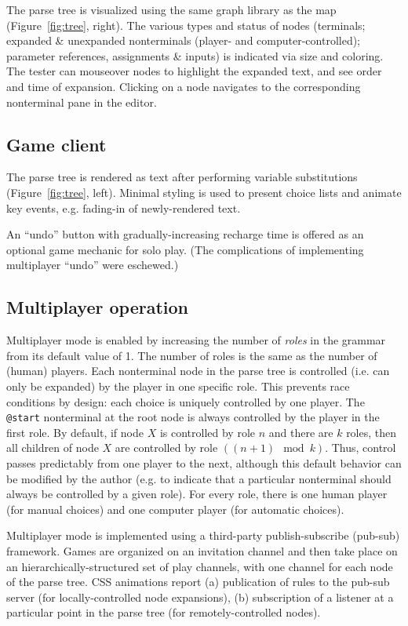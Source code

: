 \documentclass{acm_proc_article-sp}
\begin{document}
The parse tree is visualized using the same graph library as the map (Figure~\ref{fig:tree}, right).
The various types and status of nodes (terminals; expanded \& unexpanded nonterminals (player- and computer-controlled); parameter references, assignments \& inputs) is indicated via size and coloring.
The tester can mouseover nodes to highlight the expanded text, and see order and time of expansion.
Clicking on a node navigates to the corresponding nonterminal pane in the editor.

\subsection{Game client}

The parse tree is rendered as text after performing variable substitutions (Figure~\ref{fig:tree}, left).
Minimal styling is used to present choice lists and animate key events,
e.g. fading-in of newly-rendered text.

An ``undo'' button with gradually-increasing recharge time is offered as an optional game mechanic for solo play.
(The complications of implementing multiplayer ``undo'' were eschewed.)

\subsection{Multiplayer operation}

Multiplayer mode is enabled by increasing the number of {\em roles} in the grammar from its default value of 1.
The number of roles is the same as the number of (human) players.
Each nonterminal node in the parse tree is controlled (i.e. can only be expanded) by the player in one specific role.
This prevents race conditions by design: each choice is uniquely controlled by one player.
The {\tt @start} nonterminal at the root node is always controlled by the player in the first role.
By default, if node $X$ is controlled by role $n$ and there are $k$ roles,
then all children of node $X$ are controlled by role $((n+1)\mod k)$.
Thus, control passes predictably from one player to the next,
although this default behavior can be modified by the author (e.g. to indicate that a particular nonterminal
should always be controlled by a given role).
For every role, there is one human player (for manual choices)
and one computer player (for automatic choices).

Multiplayer mode is implemented using a third-party publish-subscribe (pub-sub) framework.
Games are organized on an invitation channel and then take place on an hierarchically-structured
set of play channels, with one channel for each node of the parse tree.
CSS animations report
 (a) publication of rules to the pub-sub server (for locally-controlled node expansions),
 (b) subscription of a listener at a particular point in the parse tree (for remotely-controlled nodes).
\end{document}
